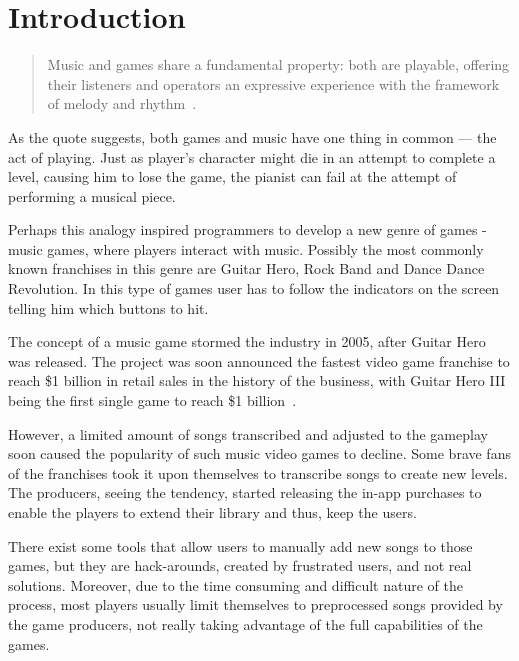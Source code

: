
\chapter{Introduction} %

\label{Chapter3} %



\begin{quotation}
Music and games share a fundamental property: both are playable, offering their listeners and operators an expressive experience with the framework of melody and rhythm~\cite{introquote}.
\end{quotation} 

As the quote suggests, both games and music have one thing in common — the act of playing. Just as player’s character might die in an attempt to complete a level, causing him to lose the game, the pianist can fail at the attempt of performing a musical piece. 

Perhaps this analogy inspired programmers to develop a new genre of games - music games, where players interact with music. Possibly the most commonly known franchises in this genre are Guitar Hero, Rock Band and Dance Dance Revolution. In this type of games user has to follow the indicators on the screen telling him which buttons to hit. 

The concept of a music game stormed the industry in 2005, after Guitar Hero was released. The project was soon announced the fastest video game franchise to reach \$1 billion in retail sales in the history of the business, with Guitar Hero III being the first single game to reach \$1 billion~\cite{GHSales}.

However, a limited amount of songs transcribed and adjusted to the gameplay soon caused the popularity of such music video games to decline. Some brave fans of the franchises took it upon themselves to transcribe songs to create new levels. The producers, seeing the tendency, started releasing the in-app purchases to enable the players to extend their library and thus, keep the users. 

There exist some tools that allow users to manually add new songs to those games, but they are hack-arounds, created by frustrated users, and not real solutions. Moreover, due to the time consuming and difficult nature of the process, most players usually limit themselves to preprocessed songs provided by the game producers, not really taking advantage of the full capabilities of the games. 

